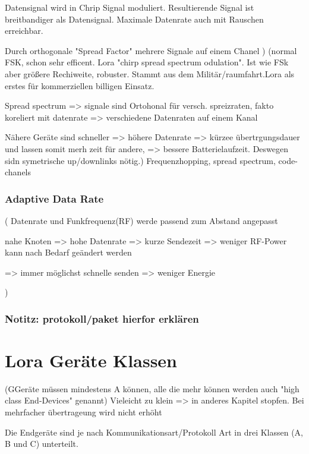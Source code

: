 \documentclass[a4paper,12pt]{article}
\begin{document}
                Datensignal wird in Chrip Signal moduliert. Resultierende Signal ist breitbandiger als Datensignal. Maximale Datenrate auch mit Rauschen erreichbar.

                Durch orthogonale "Spread Factor" mehrere Signale auf einem Chanel
            )
            \cite{WhatIsLoRa}(normal FSK, schon sehr efficent. Lora "chirp spread spectrum odulation". Ist wie FSk aber größere Rechiweite, robuster. Stammt aus dem Militär/raumfahrt.Lora als erstes für kommerziellen billigen Einsatz.
            
            Spread spectrum => signale sind Ortohonal für versch. spreizraten, fakto koreliert mit datenrate => verschiedene Datenraten auf einem Kanal
            
            Nähere Geräte sind schneller => höhere Datenrate => kürzee übertrgungsdauer und lassen somit merh zeit für andere, => bessere Batterielaufzeit. Deswegen sidn symetrische up/downlinks nötig.)
            Frequenzhopping, spread spectrum, code-chanels
                \subsubsection{Adaptive Data Rate}
                \cite{LoraLimit}(
                    Datenrate und Funkfrequenz(RF) werde passend zum Abstand angepasst

                    nahe Knoten => hohe Datenrate => kurze Sendezeit => weniger RF-Power
                    kann nach Bedarf geändert werden

                    => immer möglichst schnelle senden => weniger Energie

                )
                \subsubsection{Notitz: protokoll/paket hierfor erklären}
    \section{Lora Geräte Klassen}
        \cite{LoRaSpec}(GGeräte müssen mindestens A können, alle die mehr können werden auch "high class End-Devices" genannt)
        Vieleicht zu klein => in anderes Kapitel stopfen. Bei mehrfacher übertrageung wird nicht erhöht

        Die Endgeräte sind je nach Kommunikationsart/Protokoll Art in drei Klassen (A, B und C) unterteilt. 
        
\end{document}
